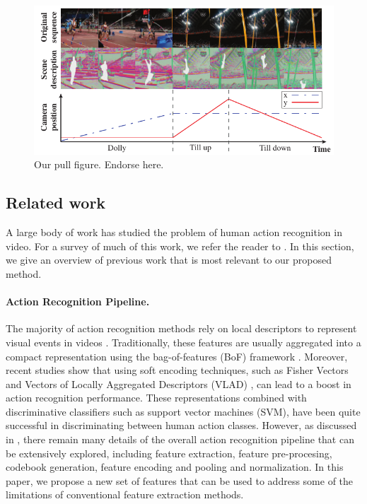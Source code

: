 \begin{figure}[ht]
\begin{center}
\includegraphics[width=0.98\linewidth]{fig/PullFigure.pdf}
\end{center}
\caption{Our pull figure. Endorse here. }
\label{fig:pull_figure}
\end{figure}



\subsection*{Related work}\label{subsec: related work}
A large body of work has studied the problem of human action recognition in video. For a survey of much of this work, we refer the reader to \cite{aggarwal2011}. In this section, we give an overview of previous work that is most relevant to our proposed method.


\paragraph{\textbf{Action Recognition Pipeline.}}The majority of action recognition methods rely on local descriptors to represent visual events in videos \cite{laptev2005,dollar2005,wang2011}. Traditionally, these features are usually aggregated into a compact representation using the bag-of-features (BoF) framework \cite{laptev2008}. Moreover, recent studies show that using soft encoding techniques, such as  Fisher Vectors \cite{perronnin2010} and Vectors of Locally Aggregated Descriptors (VLAD) \cite{jegou2012}, can lead to a boost in action recognition performance. These representations combined with discriminative classifiers such as support vector machines (SVM), have been quite successful in discriminating between human action classes. However, as discussed in \cite{xwang2013}, there remain many details of the overall action recognition pipeline that can be extensively explored, including feature extraction, feature pre-procesing, codebook generation, feature encoding and pooling and normalization. In this paper, we propose a new set of features that can be used to address some of the limitations of conventional feature extraction methods.

